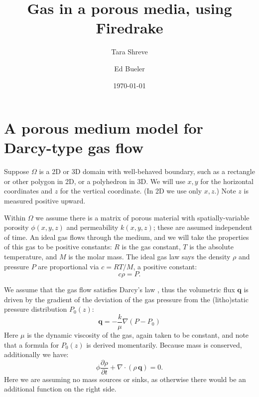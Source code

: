 \documentclass[11pt]{amsart}
\title{Gas in a porous media, using Firedrake}
\author{Tara Shreve}
\author{Ed Bueler}
\date{\today}
\newcommand{\bq}{\mathbf{q}}
\newcommand{\Div}{\nabla\cdot}
\newcommand{\grad}{\nabla}
\begin{document}
\maketitle

\thispagestyle{empty}

\section{A porous medium model for Darcy-type gas flow}

Suppose $\Omega$ is a 2D or 3D domain with well-behaved boundary, such as a rectangle or other polygon in 2D, or a polyhedron in 3D.  We will use $x,y$ for the horizontal coordinates and $z$ for the vertical coordinate.  (In 2D we use only $x,z$.)  Note $z$ is measured positive upward.

Within $\Omega$ we assume there is a matrix of porous material with spatially-variable porosity $\phi(x,y,z)$ and permeability $k(x,y,z)$; these are assumed independent of time.  An ideal gas flows through the medium, and we will take the properties of this gas to be positive constants: $R$ is the gas constant, $T$ is the absolute temperature, and $M$ is the molar mass.  The ideal gas law says the density $\rho$ and pressure $P$ are proportional via $c = RT/M$, a positive constant:
\begin{equation}
c \rho = P.  \label{eq:ideal}
\end{equation}

We assume that the gas flow satisfies Darcy's law \citep{Fowler2011}, thus the volumetric flux $\bq$ is driven by the gradient of the deviation of the gas pressure from the (litho)static pressure distribution $P_0(z)$:
\begin{equation}
\bq = - \frac{k}{\mu} \grad\left(P - P_0\right) \label{eq:pmtime:darcy}
\end{equation}
Here $\mu$ is the dynamic viscosity of the gas, again taken to be constant, and note that a formula for $P_0(z)$ is derived momentarily.  Because mass is conserved, additionally we have:
\begin{equation}
\phi \frac{\partial \rho}{\partial t} + \Div \left(\rho\, \bq\right) = 0. \label{eq:pmtime:masscont}
\end{equation}
Here we are assuming no mass sources or sinks, as otherwise there would be an additional function on the right side.
\end{document}
